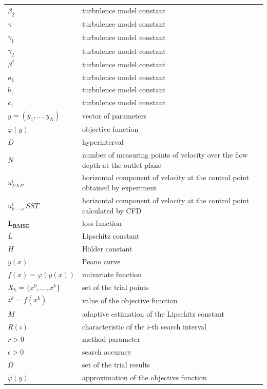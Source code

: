 \documentclass[mathematics,article,submit,pdftex,moreauthors]{Definitions/mdpi}
\begin{document}
\begin{table}[H]
\begin{tabularx}{\textwidth}{ll}
$\beta_2$ & turbulence model constant \\
$\gamma$ & turbulence model constant \\
$\gamma_1$ & turbulence model constant \\
$\gamma_2$ & turbulence model constant \\
$\beta^*$ & turbulence model constant \\
$a_1$ & turbulence model constant \\
$b_1$ & turbulence model constant \\
$c_1$ & turbulence model constant \\
$y = (y_1, ..., y_N)$ & vector of parameters\\
$\varphi(y)$		& objective function	\\
$D$	& hyperinterval	\\
$N$		& number of measuring points of velocity over the flow depth at the outlet plane	\\
$u^i_{EXP}$		& horizontal component of velocity at the control point obtained by experiment	\\
$u^i_{k-\omega}\ SST$		& horizontal component of velocity at the control point calculated by CFD	\\
$\boldsymbol{L_{RMSE}}$		& loss function	\\
$L$		& Lipschitz constant	\\
$H$		& H{\"o}lder constant	\\
$y(x)$		& Peano curve	\\
$f(x) = \varphi(y(x))$		& univariate function	\\
$X_k=\{x^0,\dots,x^k\} $ & set of the trial points \\
$z^k = f(x^k)$ & value of the objective function \\
$M$		& adaptive estimation of the Lipschitz constant \\
$R(i)$		& characteristic of the $i$-th search interval\\
$r>0$		& method parameter	\\
$\epsilon > 0$		& search accuracy	\\
$\Omega $ & set of the trial results \\
$\overline{\varphi}(y)$ & approximation of the objective function \\
\bottomrule
\end{tabularx}
\end{table}
\end{document}

